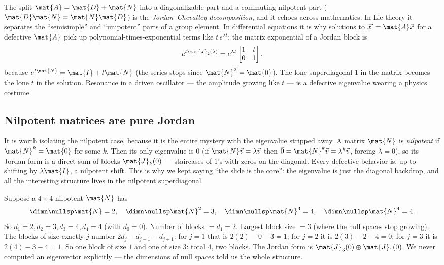 \begin{connectionbox}
The split $\mat{A}=\mat{D}+\mat{N}$ into a diagonalizable part and a commuting nilpotent
part ($\mat{D}\mat{N}=\mat{N}\mat{D}$) is the \emph{Jordan--Chevalley decomposition}, and
it echoes across mathematics. In Lie theory it separates the ``semisimple'' and
``unipotent'' parts of a group element. In differential equations it is why solutions to
$\vec{x}'=\mat{A}\vec{x}$ for a defective $\mat{A}$ pick up polynomial-times-exponential
terms like $t\,e^{\lambda t}$: the matrix exponential of a Jordan block is
\[
e^{t\mat{J}_2(\lambda)} = e^{\lambda t}\begin{bmatrix}1&t\\0&1\end{bmatrix},
\]
because $e^{t\mat{N}}=\mat{I}+t\mat{N}$ (the series stops since $\mat{N}^2=\mat{0}$). The
lone superdiagonal $1$ in the matrix becomes the lone $t$ in the solution. Resonance in a
driven oscillator --- the amplitude growing like $t$ --- is a defective eigenvalue wearing
a physics costume.
\end{connectionbox}

\subsection{Nilpotent matrices are pure Jordan}

It is worth isolating the nilpotent case, because it is the entire mystery with the
eigenvalue stripped away. A matrix $\mat{N}$ is \emph{nilpotent} if $\mat{N}^k=\mat{0}$
for some $k$. Then its only eigenvalue is $0$ (if $\mat{N}\vec{v}=\lambda\vec{v}$ then
$\vec{0}=\mat{N}^k\vec{v}=\lambda^k\vec{v}$, forcing $\lambda=0$), so its Jordan form is a
direct sum of blocks $\mat{J}_k(0)$ --- staircases of $1$'s with zeros on the diagonal.
Every defective behavior is, up to shifting by $\lambda\mat{I}$, a nilpotent shift. This
is why we kept saying ``the slide is the core'': the eigenvalue is just the diagonal
backdrop, and all the interesting structure lives in the nilpotent superdiagonal.

\begin{example}
\label{ch28:ex-nullgrowth}
Suppose a $4\times4$ nilpotent $\mat{N}$ has
\[
\dimn\nullsp\mat{N}=2,\quad \dimn\nullsp\mat{N}^2=3,\quad \dimn\nullsp\mat{N}^3=4,\quad \dimn\nullsp\mat{N}^4=4.
\]
So $d_1=2,d_2=3,d_3=4,d_4=4$ (with $d_0=0$). Number of blocks $=d_1=2$. Largest block
size $=3$ (where the null spaces stop growing). The blocks of size exactly $j$ number
$2d_j-d_{j-1}-d_{j+1}$: for $j=1$ that is $2(2)-0-3=1$; for $j=2$ it is $2(3)-2-4=0$; for
$j=3$ it is $2(4)-3-4=1$. So one block of size $1$ and one of size $3$: total $4$, two
blocks. The Jordan form is $\mat{J}_3(0)\oplus\mat{J}_1(0)$. We never computed an
eigenvector explicitly --- the dimensions of null spaces told us the whole structure.
\end{example}

